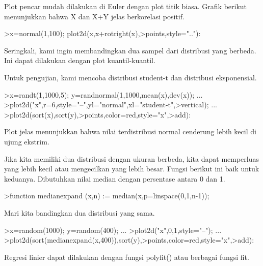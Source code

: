 \documentclass[a4paper,10pt]{article}
\begin{document}
\begin{eulernotebook}
\begin{eulercomment}
\begin{eulercomment}
\begin{eulercomment}
\begin{eulercomment}
\begin{eulercomment}
\begin{eulercomment}
\begin{eulercomment}
\begin{eulercomment}
\begin{eulercomment}
\begin{eulercomment}
\begin{eulercomment}
\begin{eulercomment}
\begin{eulercomment}
\begin{eulercomment}
\begin{eulercomment}
\begin{eulercomment}
\begin{eulercomment}
\begin{eulercomment}
\begin{eulercomment}
Plot pencar mudah dilakukan di Euler dengan plot titik biasa. Grafik
berikut menunjukkan bahwa X dan X+Y jelas berkorelasi positif.
\end{eulercomment}
\begin{eulerprompt}
>x=normal(1,100); plot2d(x,x+rotright(x),>points,style=".."):
\end{eulerprompt}
\begin{eulercomment}
Seringkali, kami ingin membandingkan dua sampel dari distribusi yang
berbeda. Ini dapat dilakukan dengan plot kuantil-kuantil.

Untuk pengujian, kami mencoba distribusi student-t dan distribusi
eksponensial.
\end{eulercomment}
\begin{eulerprompt}
>x=randt(1,1000,5); y=randnormal(1,1000,mean(x),dev(x)); ...
>plot2d("x",r=6,style="--",yl="normal",xl="student-t",>vertical); ...
>plot2d(sort(x),sort(y),>points,color=red,style="x",>add):
\end{eulerprompt}
\begin{eulercomment}
Plot jelas menunjukkan bahwa nilai terdistribusi normal cenderung
lebih kecil di ujung ekstrim.

Jika kita memiliki dua distribusi dengan ukuran berbeda, kita dapat
memperluas yang lebih kecil atau mengecilkan yang lebih besar. Fungsi
berikut ini baik untuk keduanya. Dibutuhkan nilai median dengan
persentase antara 0 dan 1.
\end{eulercomment}
\begin{eulerprompt}
>function medianexpand (x,n) := median(x,p=linspace(0,1,n-1));
\end{eulerprompt}
\begin{eulercomment}
Mari kita bandingkan dua distribusi yang sama.
\end{eulercomment}
\begin{eulerprompt}
>x=random(1000); y=random(400); ...
>plot2d("x",0,1,style="--"); ...
>plot2d(sort(medianexpand(x,400)),sort(y),>points,color=red,style="x",>add):
\end{eulerprompt}
\begin{eulercomment}
Regresi linier dapat dilakukan dengan fungsi polyfit() atau berbagai
fungsi fit.


\end{eulercomment}
\end{eulercomment}
\end{eulercomment}
\end{eulercomment}
\end{eulercomment}
\end{eulercomment}
\end{eulercomment}
\end{eulercomment}
\end{eulercomment}
\end{eulercomment}
\end{eulercomment}
\end{eulercomment}
\end{eulercomment}
\end{eulercomment}
\end{eulercomment}
\end{eulercomment}
\end{eulercomment}
\end{eulercomment}
\end{eulercomment}
\end{eulernotebook}
\end{document}
